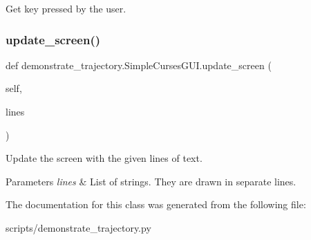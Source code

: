 Get key pressed by the user. 

\mbox{\label{classdemonstrate__trajectory_1_1SimpleCursesGUI_ae9ba316b4409ee4a52db5f373b833948}} 
\subsubsection{\texorpdfstring{update\+\_\+screen()}{update\_screen()}}
{\footnotesize\ttfamily def demonstrate\+\_\+trajectory.\+Simple\+Curses\+G\+U\+I.\+update\+\_\+screen (\begin{DoxyParamCaption}\item[{}]{self,  }\item[{}]{lines }\end{DoxyParamCaption})}



Update the screen with the given lines of text. 


\begin{DoxyParams}{Parameters}
{\em lines} & List of strings. They are drawn in separate lines. \\
\hline
\end{DoxyParams}


The documentation for this class was generated from the following file\+:\begin{DoxyCompactItemize}
\item 
scripts/demonstrate\+\_\+trajectory.\+py\end{DoxyCompactItemize}

